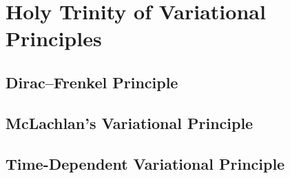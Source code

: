 \section{Holy Trinity of Variational Principles}\label{sec:variational_principles}
\subsection{Dirac--Frenkel Principle}\label{sec:dirac_frenkel_principle}
\subsection{McLachlan's Variational Principle}\label{sec:mclachlan_variational_principle}
\subsection{Time-Dependent Variational Principle}\label{sec:time_dependent_variational_principle}
